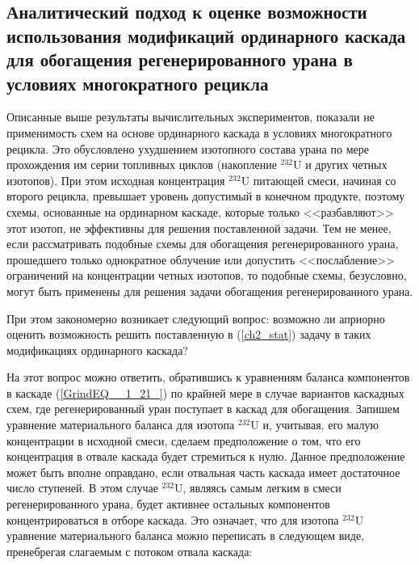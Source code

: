 
\subsection{Аналитический подход к оценке возможности использования модификаций ординарного каскада для обогащения регенерированного урана в условиях многократного рецикла}

Описанные выше результаты вычислительных экспериментов, показали не применимость схем на основе ординарного каскада в условиях  многократного рецикла. Это обусловлено ухудшением изотопного состава урана по мере прохождения им серии топливных циклов (накопление $^{232}$U и других четных изотопов). При этом исходная концентрация $^{232}$U питающей смеси, начиная со второго рецикла, превышает уровень допустимый в конечном продукте, поэтому схемы, основанные на ординарном каскаде, которые только <<разбавляют>> этот изотоп, не эффективны для решения поставленной задачи. Тем не менее, если рассматривать подобные схемы для обогащения регенерированного урана, прошедшего только однократное облучение или допустить <<послабление>> ограничений на концентрации четных изотопов, то подобные схемы, безусловно, могут быть применены для решения задачи обогащения регенерированного урана.

При этом закономерно возникает следующий вопрос: возможно ли априорно оценить возможность решить поставленную в (\ref{ch2_stat}) задачу в таких модификациях ординарного каскада? 

На этот вопрос можно ответить, обратившись к уравнениям баланса компонентов в каскаде (\ref{GrindEQ__1_21_}) по крайней мере в случае вариантов каскадных схем, где регенерированный уран поступает в каскад для обогащения. Запишем уравнение материального баланса для изотопа $^{232}$U и, учитывая, его малую концентрации в исходной смеси, сделаем предположение о том, что его концентрация в отвале каскада будет стремиться к нулю. Данное предположение может быть вполне оправдано, если отвальная часть каскада имеет достаточное число ступеней. В этом случае $^{232}$U, являясь самым легким в смеси регенерированного урана, будет активнее остальных компонентов концентрироваться в отборе каскада. Это означает, что для изотопа $^{232}$U уравнение материального баланса можно переписать в следующем виде, пренебрегая слагаемым с потоком отвала каскада:

